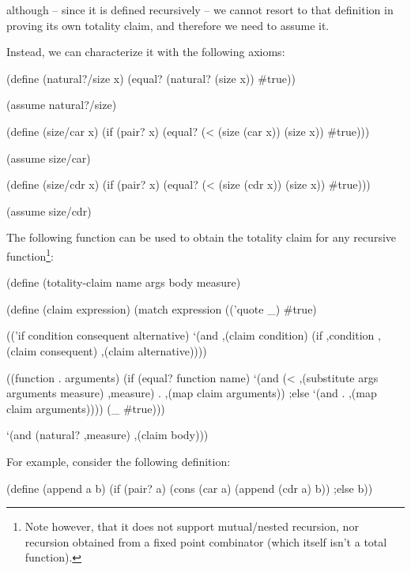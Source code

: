 although -- since it is defined recursively -- we cannot resort
to that definition in proving its own totality claim, and therefore
we need to assume it.

Instead, we can characterize it with the following axioms:

\begin{Snippet}
  (define (natural?/size x)
    (equal? (natural? (size x)) #true))

  (assume natural?/size)
\end{Snippet}
\begin{Snippet}
  (define (size/car x)
    (if (pair? x)
      (equal? (< (size (car x)) (size x)) #true)))

  (assume size/car)
\end{Snippet}
\begin{Snippet}
  (define (size/cdr x)
    (if (pair? x)
      (equal? (< (size (cdr x)) (size x)) #true)))
  
  (assume size/cdr)
\end{Snippet}

The following function can be used to obtain the totality claim
for any recursive function\footnote{Note however, that it does
  not support mutual/nested recursion, nor recursion obtained
  from a fixed point combinator (which itself isn't a total
  function).}:

\begin{Snippet}
  (define (totality-claim name args body measure)

    (define (claim expression)
      (match expression
        (('quote _)
         #true)

        (('if condition consequent alternative)
         `(and ,(claim condition)
	       (if ,condition
		   ,(claim consequent)
		   ,(claim alternative))))

        ((function . arguments)
         (if (equal? function name)
	     `(and (< ,(substitute args arguments measure) ,measure)
		   . ,(map claim arguments))
         ;else
	     `(and . ,(map claim arguments))))
        (_
         #true)))

    `(and (natural? ,measure)
	   ,(claim body)))
\end{Snippet}

For example, consider the following definition:

\begin{Snippet}
  (define (append a b)
    (if (pair? a)
      (cons (car a) (append (cdr a) b))
    ;else
      b))
\end{Snippet}

